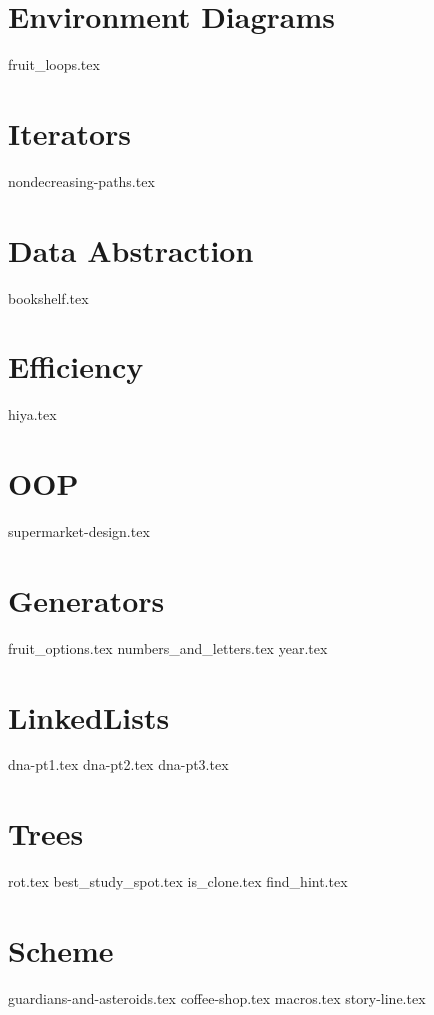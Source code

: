 \documentclass{exam}
\begin{document}
\begin{questions}
\section{Environment Diagrams}
{fruit_loops.tex}

\section{Iterators}
{nondecreasing-paths.tex}

\section{Data Abstraction}
{bookshelf.tex}

\section{Efficiency}
{hiya.tex}

\section{OOP}
{supermarket-design.tex}

\section{Generators}
{fruit_options.tex}
{numbers_and_letters.tex}
{year.tex}


\section{LinkedLists}
{dna-pt1.tex}
{dna-pt2.tex}
{dna-pt3.tex}



\section{Trees}
{rot.tex}
{best_study_spot.tex}
{is_clone.tex}
{find_hint.tex}


\section{Scheme}
{guardians-and-asteroids.tex}
{coffee-shop.tex}
{macros.tex}
{story-line.tex}

\end{questions}
\end{document}
